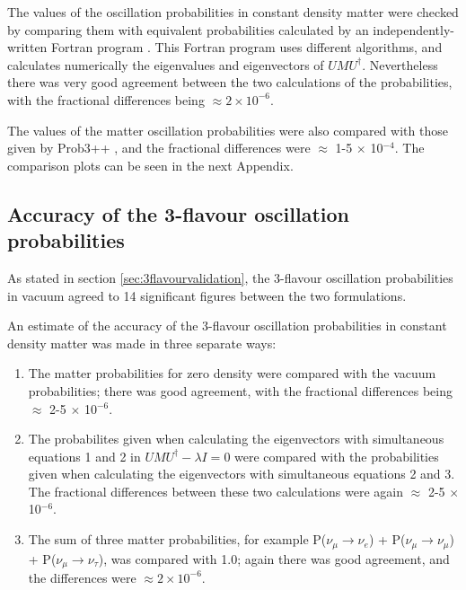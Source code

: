 The values of the oscillation probabilities in constant density matter were checked by comparing them with equivalent probabilities calculated by an 
independently-written Fortran program \cite{sloan}. This Fortran program uses different algorithms, and calculates numerically the eigenvalues and 
eigenvectors of $U M U^{\dagger}$. Nevertheless there was very good agreement between the two calculations of the probabilities, with the 
fractional differences being $\approx 2 \times 10^{-6}$. 

The values of the matter oscillation probabilities were also compared with those given by Prob3++ \cite{Prob3}, and the fractional differences were 
$\approx$ 1-5 $\times$ 10$^{-4}$. The comparison plots can be seen in the next Appendix.

\subsection{Accuracy of the 3-flavour oscillation probabilities} 
\label{sec:3flavouraccuracy}

As stated in section \ref{sec:3flavourvalidation}, the 3-flavour oscillation probabilities in vacuum agreed to 14 significant figures between the two 
formulations.

An estimate of the accuracy of the 3-flavour oscillation probabilities in constant density matter was made in three separate ways: 
\begin{enumerate}
\item The matter probabilities for zero density were compared with the vacuum probabilities; there was good agreement, with the fractional differences being 
$\approx$ 2-5 $\times$ 10$^{-6}$. 
\item The probabilites given when calculating the eigenvectors with simultaneous equations 1 and 2 in $U M U^{\dagger} - \lambda I = 0$ were compared 
with the probabilities given when calculating the eigenvectors with simultaneous equations 2 and 3. The fractional differences between these two 
calculations were again $\approx$ 2-5 $\times$ 10$^{-6}$.
\item The sum of three matter probabilities, for example P($\nu_{\mu} \rightarrow \nu_{e}$) + P($\nu_{\mu} \rightarrow \nu_{\mu}$) + 
P($\nu_{\mu} \rightarrow \nu_{\tau}$), was compared with 1.0; again there was good agreement, and the differences were $\approx 2 \times 10^{-6}$. 
\end{enumerate}

